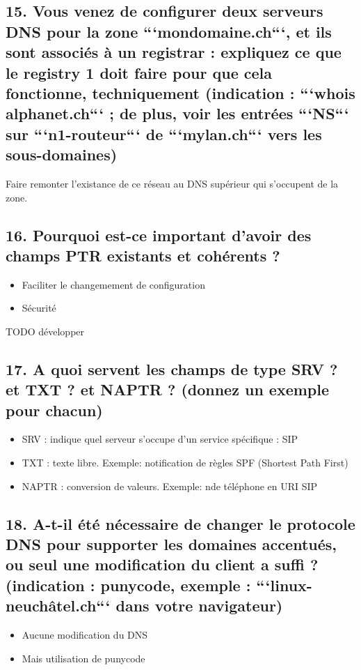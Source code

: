 \documentclass{article}
\begin{document}
\subsection*{15. Vous venez de configurer deux serveurs DNS pour la zone ```mondomaine.ch```, et ils sont associés à un registrar : expliquez ce que le registry 1 doit faire pour que cela fonctionne, techniquement (indication : ```whois alphanet.ch``` ; de plus, voir les entrées ```NS``` sur ```n1-routeur``` de ```mylan.ch``` vers les sous-domaines)}
Faire remonter l'existance de ce réseau au DNS supérieur qui s'occupent de la zone.

\subsection*{16. Pourquoi est-ce important d’avoir des champs PTR existants et cohérents ?}
\begin{itemize}
\item Faciliter le changemement de configuration
\item Sécurité
\end{itemize}
TODO développer

\subsection*{17. A quoi servent les champs de type SRV ? et TXT ? et NAPTR ? (donnez un exemple pour chacun)}
\begin{itemize}
\item SRV : indique quel serveur s'occupe d'un service spécifique : SIP
\item TXT : texte libre. Exemple: notification de règles SPF (Shortest Path First)
\item NAPTR : conversion de valeurs. Exemple: n\degre de téléphone en URI SIP
\end{itemize}

\subsection*{18. A-t-il été nécessaire de changer le protocole DNS pour supporter les domaines accentués, ou seul une modification du client a suffi ? (indication : punycode, exemple : ```linux-neuchâtel.ch``` dans votre navigateur)}
\begin{itemize}
\item Aucune modification du DNS
\item Mais utilisation de punycode
\end{itemize}
\end{document}
